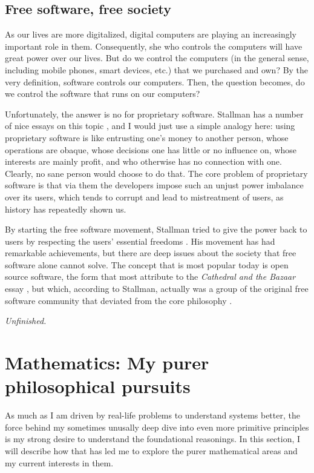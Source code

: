 \documentclass{article}
\begin{document}
\subsection[Free software, free society]{
Free software, free society\protect\footnotemark}

As our lives are more digitalized, digital computers are playing an
increasingly important role in them. Consequently, she who controls the
computers will have great power over our lives. But do we control the computers
(in the general sense, including mobile phones, smart devices, etc.) that we
purchased and own? By the very definition, software controls our computers.
Then, the question becomes, do we control the software that runs on our
computers?

Unfortunately, the answer is no for proprietary software. Stallman
has a number of nice essays on this topic \cite{stallman.essays}, and I would
just use a simple analogy here: using proprietary software is like entrusting
one's money to another person, whose operations are obaque, whose decisions one
has little or no influence on, whose interests are mainly profit, and who
otherwise has no connection with one. Clearly, no sane person would choose to
do that.  The core problem of proprietary software is that via them the
developers impose such an unjust power imbalance over its users, which tends to
corrupt and lead to mistreatment of users, as history has repeatedly shown us.

By starting the free software movement, Stallman tried to give the power back
to users by respecting the users' essential
freedoms \cite[Essay~1]{stallman.essays}. His movement has had remarkable
achievements, but there are deep issues about the society that free software
alone cannot solve. The concept that is most popular today is open source
software, the form that most attribute to the \emph{Cathedral and the Bazaar}
essay \cite{cathedral.bazaar}, but which, according to Stallman, actually was a
group of the original free software community that deviated from the core
philosophy \cite[Essay~14]{stallman.essays}.

\emph{Unfinished.}


\section{Mathematics: My purer philosophical pursuits} \label{sec.math}
As much as I am driven by real-life problems to understand systems better, the
force behind my sometimes unusally deep dive into even more primitive
principles is my strong desire to understand the foundational reasonings. In
this section, I will describe how that has led me to explore the purer
mathematical areas and my current interests in them.
\end{document}
